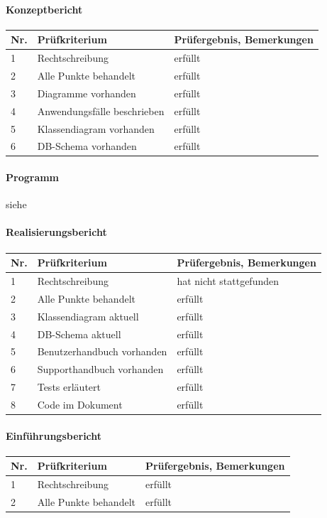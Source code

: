 \documentclass[10pt,paper=a4,final]{scrartcl}
\begin{document}
\paragraph{Konzeptbericht}
\begin{tabularx}{\textwidth}{|l|X|X|}
  \hline
  {{\bf Nr.}}\cellcolor{blue!20!} & {\bf Pr\"ufkriterium}\cellcolor{blue!20!} & {\bf Pr\"ufergebnis, Bemerkungen}\cellcolor{blue!20!} \\ \hline
  1 & Rechtschreibung & erf\"ullt \\ \hline
  2 & Alle Punkte behandelt & erf\"ullt \\ \hline
  3 & Diagramme vorhanden & erf\"ullt \\ \hline
  4 & Anwendungsf\"alle beschrieben & erf\"ullt \\ \hline
  5 & Klassendiagram vorhanden & erf\"ullt \\ \hline
  6 & DB-Schema vorhanden & erf\"ullt \\ \hline
\end{tabularx}
\paragraph{Programm}
siehe \cite[4. Systemtests]{realisierung} 
\paragraph{Realisierungsbericht}
\begin{tabularx}{\textwidth}{|l|X|X|}
  \hline
  {{\bf Nr.}}\cellcolor{blue!20!} & {\bf Pr\"ufkriterium}\cellcolor{blue!20!} & {\bf Pr\"ufergebnis, Bemerkungen}\cellcolor{blue!20!} \\ \hline
  1 & Rechtschreibung & hat nicht stattgefunden\\ \hline
  2 & Alle Punkte behandelt & erf\"ullt\\ \hline
  3 & Klassendiagram aktuell& erf\"ullt \\ \hline
  4 & DB-Schema aktuell& erf\"ullt \\ \hline
  5 & Benutzerhandbuch vorhanden& erf\"ullt \\ \hline
  6 & Supporthandbuch vorhanden& erf\"ullt \\ \hline
  7 & Tests erl\"autert& erf\"ullt \\ \hline
  8 & Code im Dokument& erf\"ullt \\ \hline
\end{tabularx}
\paragraph{Einf\"uhrungsbericht}
\begin{tabularx}{\textwidth}{|l|X|X|}
  \hline
  {{\bf Nr.}}\cellcolor{blue!20!} & {\bf Pr\"ufkriterium}\cellcolor{blue!20!} & {\bf Pr\"ufergebnis, Bemerkungen}\cellcolor{blue!20!} \\ \hline
  1 & Rechtschreibung & erf\"ullt \\ \hline
  2 & Alle Punkte behandelt & erf\"ullt \\ \hline
\end{tabularx}
\end{document}
